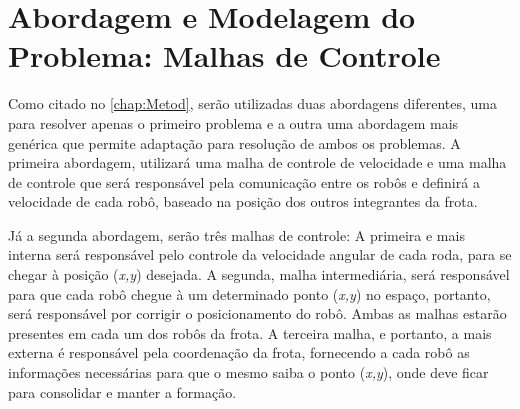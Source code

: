 %
%

\chapter{Abordagem e Modelagem do Problema: Malhas de Controle}
\label{chap:abordagememdelo}


Como citado no \autoref{chap:Metod}, serão utilizadas duas abordagens diferentes, uma para resolver apenas o primeiro problema e a outra uma abordagem mais genérica que permite adaptação para resolução de ambos os problemas. A primeira abordagem, utilizará uma malha de controle de velocidade e uma malha de controle que será responsável pela comunicação entre os robôs e definirá a velocidade de cada robô, baseado na posição dos outros integrantes da frota.

Já a segunda abordagem, serão três malhas de controle: A primeira e mais interna será responsável pelo controle da velocidade angular de cada roda, para se chegar à posição (\emph{x,y}) desejada. A segunda, malha intermediária, será responsável para que cada robô chegue à um determinado ponto (\emph{x,y}) no espaço, portanto, será responsável por corrigir o posicionamento do robô. Ambas as malhas estarão presentes em cada um dos robôs da frota. A terceira malha, e portanto, a mais externa é responsável pela coordenação da frota, fornecendo a cada robô as informações necessárias para que o mesmo saiba o ponto (\emph{x,y}), onde deve ficar para consolidar e manter a formação.

